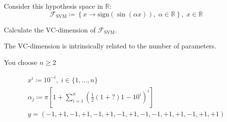 \begin{exercise}{}{}
  Consider this hypothesis space in $\mathds{R}$:
  \begin{equation*}
    \mathcal{F}_\text{SVM} \coloneqq \left\{
      x \to \text{sign}\left( \sin (\alpha x)\right),\; \alpha \in \mathds{R}
    \right\},\; x \in \mathds{R}
  \end{equation*}

  Calculate the VC-dimension of $\mathcal{F}_\text{SVM}$.

  \tcblower

  The VC-dimension is intrinsically related to the number
  of parameters.

  You choose $n \geq 2$

  \begin{align*}
    x^i \coloneqq 10^{-i},\; i \in \{1, \ldots, n\} \\
    \alpha_j \coloneqq \pi \left[
      1 + \sum_{i=1}^n \left( \frac{1}{2}(1 + ?)1-10^i \right)^i
    \right] \\
    y = (-1, +1, -1, +1, -1, +1, -1, +1, -1, -1,  +1, +1, -1, +1, +1)
  \end{align*}

\end{exercise}
